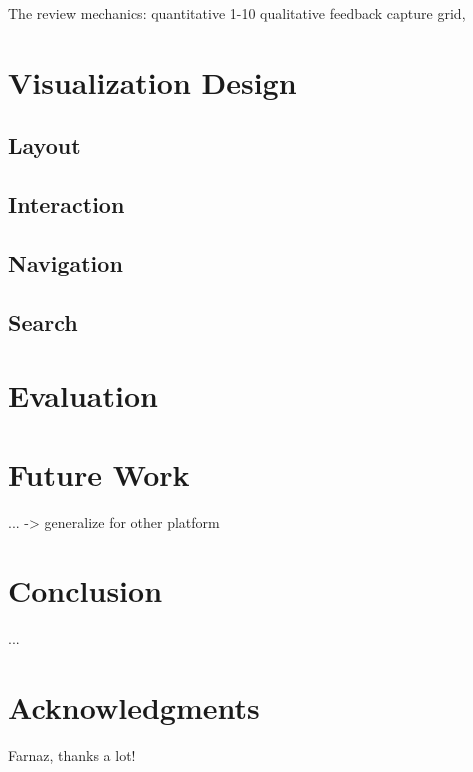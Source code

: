 \documentclass{sigchi}
\begin{document}
The review mechanics: 
quantitative 1-10
qualitative feedback capture grid,


\section{Visualization Design}

\subsection{Layout}

\subsection{Interaction}

\subsection{Navigation}
\subsection{Search}

\section{Evaluation}

\section{Future Work}
... -> generalize for other platform

\section{Conclusion}
...

\section{Acknowledgments}
Farnaz, thanks a lot!

%
%
%
%
%
\balance



\end{document}
